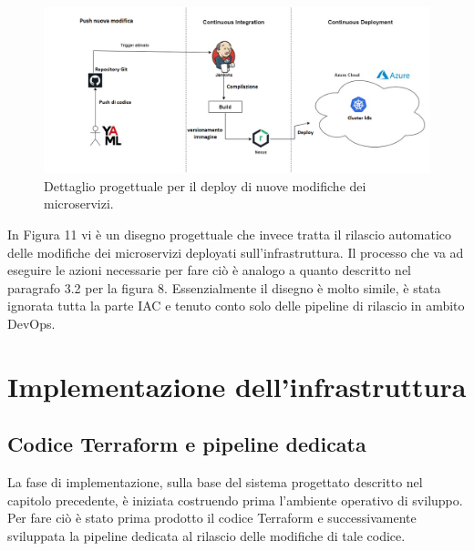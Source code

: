 \documentclass[a4paper,12pt]{report}
\begin{document}
\begin{figure}[h]
	\includegraphics[width=1.0\textwidth]{push_modifica}
    \caption{Dettaglio progettuale per il deploy di nuove modifiche dei microservizi.}
    \label{fig:push_modifica}
\end{figure}
\newline In Figura 11 vi è un disegno progettuale che invece tratta il rilascio automatico delle modifiche dei microservizi deployati sull'infrastruttura. Il processo che va ad eseguire le azioni necessarie per fare ciò è analogo a quanto descritto nel paragrafo 3.2 per la figura 8. Essenzialmente il disegno è molto simile, è stata ignorata tutta la parte IAC e tenuto conto solo delle pipeline di rilascio in ambito DevOps.\\
\chapter{Implementazione dell'infrastruttura}
\section{Codice Terraform e pipeline dedicata}
La fase di implementazione, sulla base del sistema progettato descritto nel capitolo precedente, è iniziata costruendo prima l'ambiente operativo di sviluppo. \\
Per fare ciò è stato prima prodotto il codice Terraform e successivamente sviluppata la pipeline dedicata al rilascio delle modifiche di tale codice.
\end{document}
